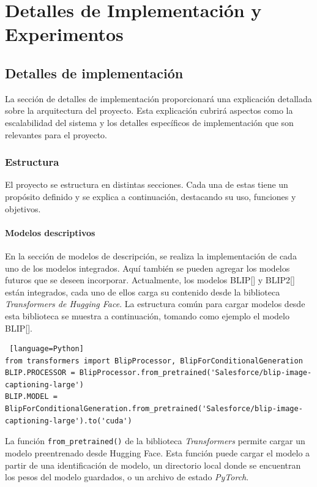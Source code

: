 \chapter{Detalles de Implementación y Experimentos}\label{chapter:implementation}


\section{Detalles de implementaci\'on}
La sección de detalles de implementación proporcionar\'a una explicación detallada sobre la arquitectura del proyecto. Esta explicación cubrir\'a aspectos como la escalabilidad del sistema y los detalles específicos de implementación que son relevantes para el proyecto.

\subsection{Estructura}
El proyecto se estructura en distintas secciones. Cada una de estas tiene un propósito definido y se explica a continuación, destacando su uso, funciones y objetivos.

\subsubsection{Modelos descriptivos}
 En la sección de modelos de descripción, se realiza la implementación de cada uno de los modelos integrados. Aquí también se pueden agregar los modelos futuros que se deseen incorporar. Actualmente, los modelos BLIP[\cite{huggingface2022blip}] y BLIP2[\cite{huggingface-blip2}] est\'an integrados, cada uno de ellos carga su contenido desde la biblioteca \textit{Transformers de Hugging Face}. La estructura común para cargar modelos desde esta biblioteca se muestra a continuación, tomando como ejemplo el modelo BLIP[\cite{huggingface2022blip}].

\begin{lstlisting} [language=Python]
from transformers import BlipProcessor, BlipForConditionalGeneration
BLIP.PROCESSOR = BlipProcessor.from_pretrained('Salesforce/blip-image-captioning-large')
BLIP.MODEL = BlipForConditionalGeneration.from_pretrained('Salesforce/blip-image-captioning-large').to('cuda')
\end{lstlisting}

La función \verb|from_pretrained()| de la biblioteca \textit{Transformers} permite cargar un modelo preentrenado desde Hugging Face. Esta función puede cargar el modelo a partir de una identificación de modelo, un directorio local donde se encuentran los pesos del modelo guardados, o un archivo de estado \textit{PyTorch}. 

